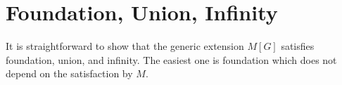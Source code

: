 \section{Foundation, Union, Infinity}
\label{sec:easy-axioms}

It is straightforward to show that the generic extension $M[G]$
satisfies foundation, union, and infinity. The easiest one is
foundation which does not depend on the satisfaction by $M$.




